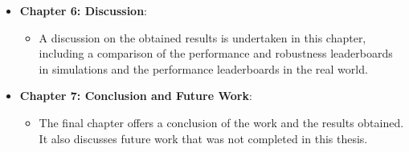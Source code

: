 \begin{itemize}
  \item \textbf{Chapter 6: Discussion}:
    \begin{itemize}
      \item A discussion on the obtained results is undertaken in this chapter, including a comparison of the performance and robustness leaderboards in simulations and the performance leaderboards in the real world.
    \end{itemize}
  
  \item \textbf{Chapter 7: Conclusion and Future Work}:
    \begin{itemize}
      \item The final chapter offers a conclusion of the work and the results obtained. It also discusses future work that was not completed in this thesis.
    \end{itemize}
\end{itemize}






\cleardoublepage
